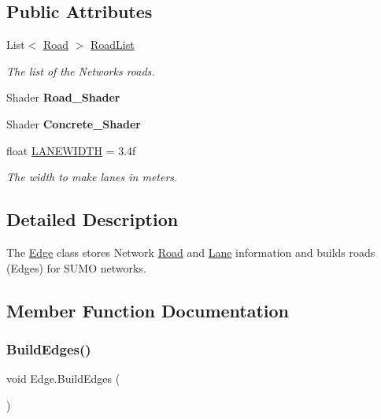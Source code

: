 \subsection*{Public Attributes}
\begin{DoxyCompactItemize}
\item 
List$<$ \mbox{\hyperlink{struct_road}{Road}} $>$ \mbox{\hyperlink{class_edge_ada376fd8a81711e44ab425c32a85e844}{Road\+List}}
\begin{DoxyCompactList}\small\item\em The list of the Networks roads. \end{DoxyCompactList}\item 
\mbox{\label{class_edge_a63c171b9e0912dcc3c03e85881a64b42}} 
Shader {\bfseries Road\+\_\+\+Shader}
\item 
\mbox{\label{class_edge_a7e2a2b475f5e13684ec383eb5a78f8b4}} 
Shader {\bfseries Concrete\+\_\+\+Shader}
\item 
float \mbox{\hyperlink{class_edge_abce1274185524bbf90f49b8214130fd1}{L\+A\+N\+E\+W\+I\+D\+TH}} = 3.\+4f
\begin{DoxyCompactList}\small\item\em The width to make lanes in meters. \end{DoxyCompactList}\end{DoxyCompactItemize}


\subsection{Detailed Description}
The \mbox{\hyperlink{class_edge}{Edge}} class stores Network \mbox{\hyperlink{struct_road}{Road}} and \mbox{\hyperlink{struct_lane}{Lane}} information and builds roads (Edges) for S\+U\+MO networks. 



\subsection{Member Function Documentation}
\mbox{\label{class_edge_af671777176dc831d8a08e49f032fc763}} 
\subsubsection{\texorpdfstring{BuildEdges()}{BuildEdges()}}
{\footnotesize\ttfamily void Edge.\+Build\+Edges (\begin{DoxyParamCaption}{ }\end{DoxyParamCaption})}



